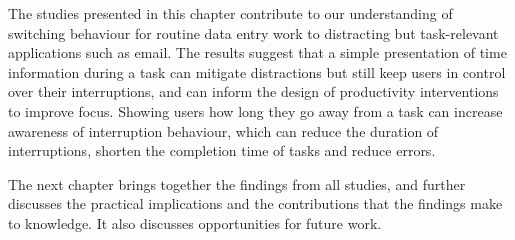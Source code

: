 The studies presented in this chapter contribute to our understanding of switching behaviour for routine data entry work to distracting but task-relevant applications such as email. The results suggest that a simple presentation of time information during a task can mitigate distractions but still keep users in control over their interruptions, and can inform the design of productivity interventions to improve focus. Showing users how long they go away from a task can increase awareness of interruption behaviour, which can reduce the duration of interruptions, shorten the completion time of tasks and reduce errors.

The next chapter brings together the findings from all studies, and further discusses the practical implications and the contributions that the findings make to knowledge. It also discusses opportunities for future work.
